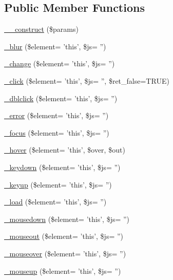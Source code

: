 \subsection*{Public Member Functions}
\begin{DoxyCompactItemize}
\item 
\hyperlink{class_c_i___jquery_a9162320adff1a1a4afd7f2372f753a3e}{\-\_\-\-\_\-construct} (\$params)
\item 
\hyperlink{class_c_i___jquery_af28fbf01a4418e2bb3e93a9a716248d8}{\-\_\-blur} (\$element= 'this', \$js= '')
\item 
\hyperlink{class_c_i___jquery_abb95dffbc65cae5c082bd420f4481d60}{\-\_\-change} (\$element= 'this', \$js= '')
\item 
\hyperlink{class_c_i___jquery_a80855ab8fcdffa6a4b6003d240749391}{\-\_\-click} (\$element= 'this', \$js= '', \$ret\-\_\-false=T\-R\-U\-E)
\item 
\hyperlink{class_c_i___jquery_adc098d89d426ba40e9c06652214c8a86}{\-\_\-dblclick} (\$element= 'this', \$js= '')
\item 
\hyperlink{class_c_i___jquery_a6e3e47849dde9e62e2cf52d74304ee91}{\-\_\-error} (\$element= 'this', \$js= '')
\item 
\hyperlink{class_c_i___jquery_add25f6f9e5c5668bb8263db99aa93659}{\-\_\-focus} (\$element= 'this', \$js= '')
\item 
\hyperlink{class_c_i___jquery_a3a1b592acf47a5961eee1f06d4e9834b}{\-\_\-hover} (\$element= 'this', \$over, \$out)
\item 
\hyperlink{class_c_i___jquery_a3b5601144b1894bdd735c42a4c2d3df5}{\-\_\-keydown} (\$element= 'this', \$js= '')
\item 
\hyperlink{class_c_i___jquery_a9a000183ccaca2b995e67085f81b14fd}{\-\_\-keyup} (\$element= 'this', \$js= '')
\item 
\hyperlink{class_c_i___jquery_ac93429cce1bc09272410f27545f93a7a}{\-\_\-load} (\$element= 'this', \$js= '')
\item 
\hyperlink{class_c_i___jquery_a302e802a5cf2fa5592c47da43ce188dd}{\-\_\-mousedown} (\$element= 'this', \$js= '')
\item 
\hyperlink{class_c_i___jquery_a2b281e648122112c34511be1d0eb99ad}{\-\_\-mouseout} (\$element= 'this', \$js= '')
\item 
\hyperlink{class_c_i___jquery_a591a97a67846ab69c0e66daa317d62ab}{\-\_\-mouseover} (\$element= 'this', \$js= '')
\item 
\hyperlink{class_c_i___jquery_a0206c9182950f2128741884303734c93}{\-\_\-mouseup} (\$element= 'this', \$js= '')

\end{DoxyCompactItemize}
